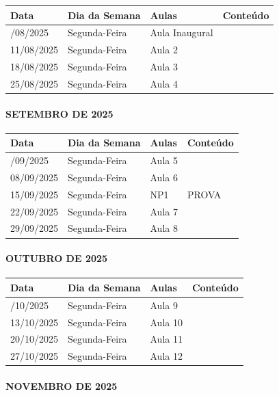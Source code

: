\documentclass[
]{book}
\begin{document}
\begin{longtable}[]{@{}llll@{}}
\toprule\noalign{}
Data & Dia da Semana & Aulas & Conteúdo \\
\midrule\noalign{}
\endhead
\bottomrule\noalign{}
\endlastfoot
04/08/2025 & Segunda-Feira & Aula Inaugural & \\
11/08/2025 & Segunda-Feira & Aula 2 & \\
18/08/2025 & Segunda-Feira & Aula 3 & \\
25/08/2025 & Segunda-Feira & Aula 4 & \\
\end{longtable}

\paragraph{SETEMBRO DE 2025}\label{setembro-de-2025}

\begin{longtable}[]{@{}llll@{}}
\toprule\noalign{}
Data & Dia da Semana & Aulas & Conteúdo \\
\midrule\noalign{}
\endhead
\bottomrule\noalign{}
\endlastfoot
01/09/2025 & Segunda-Feira & Aula 5 & \\
08/09/2025 & Segunda-Feira & Aula 6 & \\
15/09/2025 & Segunda-Feira & NP1 & PROVA \\
22/09/2025 & Segunda-Feira & Aula 7 & \\
29/09/2025 & Segunda-Feira & Aula 8 & \\
\end{longtable}

\paragraph{OUTUBRO DE 2025}\label{outubro-de-2025}

\begin{longtable}[]{@{}llll@{}}
\toprule\noalign{}
Data & Dia da Semana & Aulas & Conteúdo \\
\midrule\noalign{}
\endhead
\bottomrule\noalign{}
\endlastfoot
06/10/2025 & Segunda-Feira & Aula 9 & \\
13/10/2025 & Segunda-Feira & Aula 10 & \\
20/10/2025 & Segunda-Feira & Aula 11 & \\
27/10/2025 & Segunda-Feira & Aula 12 & \\
\end{longtable}

\paragraph{NOVEMBRO DE 2025}\label{novembro-de-2025}
\end{document}
